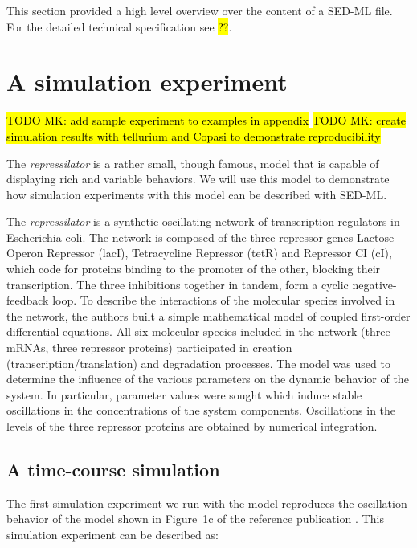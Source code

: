 This section provided a high level overview over the content of a SED-ML file. For the detailed technical specification see \hl{??}. 



\section{A simulation experiment}
\label{motivation:example}

\hl{TODO MK: add sample experiment to examples in appendix}
\hl{TODO MK: create simulation results with tellurium and Copasi to demonstrate reproducibility}

The \emph{repressilator} \citep{Elowitz:2000} is a rather small, though famous, model that is capable of displaying rich and variable behaviors. We will use this model to demonstrate how simulation experiments with this model can be described with SED-ML. 

The \emph{repressilator} is a synthetic oscillating network of transcription regulators in Escherichia coli. The network is composed of the three repressor genes Lactose Operon Repressor (lacI), Tetracycline Repressor (tetR) and Repressor CI (cI), which code for proteins binding to the promoter of the other, blocking their transcription. The three inhibitions together in tandem, form a cyclic negative-feedback loop. To describe the interactions of the molecular species involved in the network, the authors built a simple mathematical model of coupled first-order differential equations. All six molecular species included in the network (three mRNAs, three repressor proteins) participated in creation (transcription/translation) and degradation processes. The model was used to determine the influence of the various parameters on the dynamic behavior of the system. In particular, parameter values were sought which induce stable oscillations in the concentrations of the system components. Oscillations in the levels of the three repressor proteins are obtained by numerical integration. 


\subsection{A time-course simulation}
\label{sec:timecourse}
The first simulation experiment we run with the model reproduces the oscillation behavior of the model shown in Figure~1c of the reference publication \citep{Elowitz:2000}. This simulation experiment can be described as:

